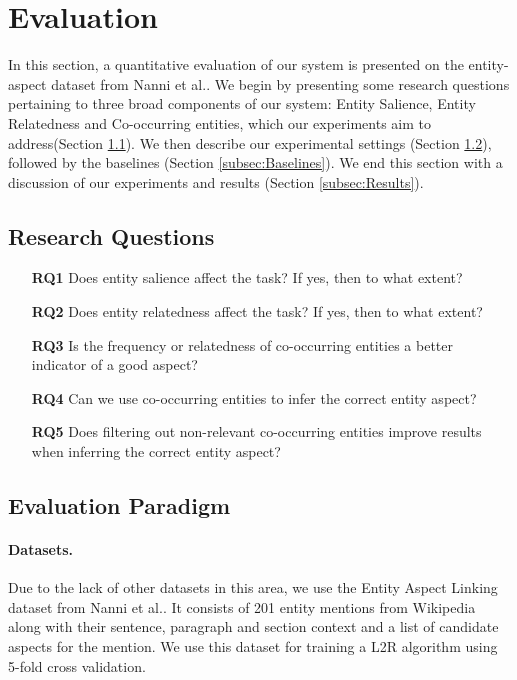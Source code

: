 \newcommand{\todo}[1]{\textcolor{red}{TODO: #1}\PackageWarning{TODO:}{#1!}}

\section{Evaluation}
\label{sec:Evaluation}
In this section, a quantitative evaluation of our system is presented on the entity-aspect dataset from Nanni et al.\cite{nanni2018entity}. We begin by presenting some research questions pertaining to three broad components of our system: Entity Salience, Entity Relatedness and Co-occurring entities, which our experiments aim to address(Section \ref{subsec:Research Questions}). We then describe our experimental settings (Section \ref{subsec:Evaluation Paradigm}), followed by the baselines (Section \ref{subsec:Baselines}). We end this section with a discussion of our experiments and results (Section \ref{subsec:Results}).

\subsection{Research Questions}
\label{subsec:Research Questions}

\begin{itemize}
\item[\textbf{RQ1}] Does entity salience affect the task? If yes, then to what extent?
\item[\textbf{RQ2}] Does entity relatedness affect the task? If yes, then to what extent? 
\item[\textbf{RQ3}] Is the frequency or relatedness of co-occurring entities a better indicator of a good aspect?
\item[\textbf{RQ4}] Can we use co-occurring entities to infer the correct entity aspect?
\item[\textbf{RQ5}] Does filtering out non-relevant co-occurring entities improve results when inferring the correct entity aspect?
\end{itemize}

\subsection{Evaluation Paradigm}
\label{subsec:Evaluation Paradigm}

\paragraph{\textbf{Datasets.}} Due to the lack of other datasets in this area, we use the Entity Aspect Linking dataset from Nanni et al.\cite{nanni2018entity}. It consists of 201 entity mentions from Wikipedia along with their sentence, paragraph and section context and a list of candidate aspects for the mention. We use this dataset for training a L2R algorithm using 5-fold cross validation. 

